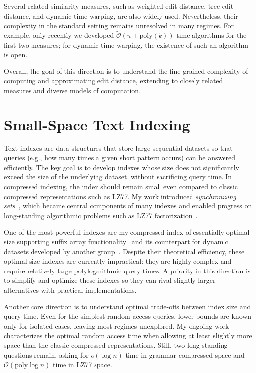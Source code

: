 \documentclass[a4paper,11pt]{article}
\newcommand{\Oh}{\mathcal{O}}
\newcommand{\Ohtilde}{\tilde{\mathcal{O}}}
\begin{document}
Several related similarity measures, such as weighted edit distance, tree edit distance, and dynamic time warping, are also widely used. 
Nevertheless, their complexity in the standard setting remains unresolved in many regimes. 
For example, only recently we developed $\Ohtilde(n+\mathrm{poly}(k))$-time algorithms for the first two measures; for dynamic time warping, the existence of such an algorithm is open.  

Overall, the goal of this direction is to understand the fine-grained complexity of computing and approximating edit distance, extending to closely related measures and diverse models of computation.

\section{Small-Space Text Indexing}

Text indexes are data structures that store large sequential datasets so that queries (e.g., how many times a given short pattern occurs) can be answered efficiently. 
The key goal is to develop indexes whose size does not significantly exceed the size of the underlying dataset, without sacrificing query time. 
In compressed indexing, the index should remain small even compared to classic compressed representations such as LZ77.  
My work introduced \emph{synchronizing sets}~\cite{KK19}, which became central components of many indexes and enabled progress on long-standing algorithmic problems such as LZ77 factorization~\cite{KK24}.  

One of the most powerful indexes are my compressed index of essentially optimal size supporting suffix array functionality~\cite{KK23} and its counterpart for dynamic datasets developed by another group~\cite{NT24}.
Despite their theoretical efficiency, these optimal-size indexes are currently impractical: they are highly complex and require relatively large polylogarithmic query times.
A priority in this direction is to simplify and optimize these indexes so they can rival slightly larger alternatives with practical implementations. 

Another core direction is to understand optimal trade-offs between index size and query time. 
Even for the simplest random access queries, lower bounds are known only for isolated cases, leaving most regimes unexplored. 
My ongoing work characterizes the optimal random access time when allowing at least slightly more space than the classic compressed representations. Still, two long-standing questions remain, asking for $o(\log n)$ time in grammar-compressed space and $\Oh(\mathrm{poly}\log n)$ time in LZ77 space.  
\end{document}
